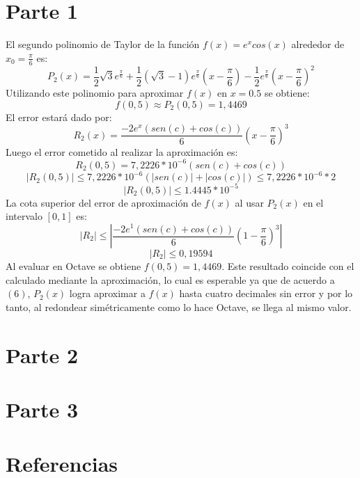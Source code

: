 \documentclass[titlepage,a4paper]{article}
\begin{document}
\section{Parte 1}\label{sec:parte1}
El segundo polinomio de Taylor de la función $ f(x) = e^xcos(x) $ alrededor de $ x_0 = \frac{\pi}{6} $ es:
	\begin{equation}
	P_2(x) = \frac{1}{2}\sqrt{3}e^{\frac{\pi}{6}} + \frac{1}{2}(\sqrt{3} - 1)e^{\frac{\pi}{6}}(x - \frac{\pi}{6}) - \frac{1}{2}e^{\frac{\pi}{6}}(x - \frac{\pi}{6})^2
	\end{equation}
Utilizando este polinomio para aproximar $ f(x) $ en $ x = 0.5 $ se obtiene:
	\begin{equation}
	f(0,5) \approx P_2(0,5) = 1,4469
	\end{equation}
El error estará dado por:
	\begin{equation}
	R_2(x) = \frac{-2e^{x}(sen(c) + cos(c))}{6}(x - \frac{\pi}{6})^3
	\end{equation}
Luego el error cometido al realizar la aproximación es:
	\begin{equation*}
	R_2(0,5) = 7,2226*10^{-6}(sen(c) + cos(c))
	\end{equation*}
	\begin{equation*}
	| R_2(0,5) | \leq 7,2226*10^{-6}(|sen(c)| + |cos(c)|) \leq 7,2226*10^{-6}*2
	\end{equation*}
	\begin{equation}
	| R_2(0,5) | \leq 1.4445*10^{-5}
	\end{equation}
La cota superior del error de aproximación de $ f(x) $ al usar $ P_2(x) $ en el intervalo $ [0, 1] $ es:
	\begin{equation*}
	| R_2 | \leq | \frac{-2e^{1}(sen(c) + cos(c))}{6}(1 - \frac{\pi}{6})^3 |
	\end{equation*}
	\begin{equation}
	| R_2 | \leq 0,19594
	\end{equation}
Al evaluar en Octave se obtiene $ f(0,5) = 1,4469 $. Este resultado coincide con el calculado mediante la aproximación, lo cual es esperable ya que de acuerdo a $(6)$, $P_2(x)$ logra aproximar a $f(x)$ hasta cuatro decimales sin error y por lo tanto, al redondear simétricamente como lo hace Octave, se llega al mismo valor.

\section{Parte 2}\label{sec:parte2}


\section{Parte 3}\label{sec:parte3}


\section{Referencias}\label{sec:parte4}
\end{document}
